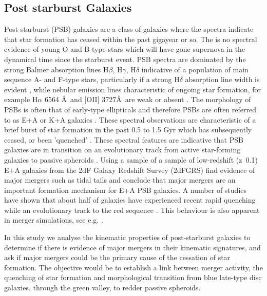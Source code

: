 \subsection{Post starburst Galaxies}

Post-starburst (PSB) galaxies are a class of galaxies where the spectra indicate that star formation has ceased within the past gigayear or so. The is no spectral evidence of young O and B-type stars which will have gone supernova in the dynamical time since the starburst event. PSB spectra are dominated by the strong Balmer absorption lines H$\beta$, H$\gamma$, H$\delta$ indicative of a population of main sequence A- and F-type stars, particularly if a strong  H$\delta$ absorption line width is evident \citep{1997A&A...325.1025P}, while nebular emission lines characteristic of ongoing star formation, for example H$\alpha$ 6564 \AA\ and [OII] 3727\AA\, are weak or absent \citep{2001ApJ...547L..17B,2003PASJ...55..771G,2004MNRAS.355..713B,2005MNRAS.357..937G,2018MNRAS.477.1708P}. The morphology of PSBs is often that of early-type ellipticals and therefore PSBs are often referred to as E+A or K+A galaxies \citep{1983ApJ...270....7D,1996ApJ...466..104Z,2009ARA&A..47..159B}. These spectral observations are characteristic of a brief burst of star formation in the past 0.5 to 1.5 Gyr which has subsequently ceased, or been 'quenched' \citep{1983ApJ...270....7D,1987MNRAS.229..423C,1997A&A...325.1025P}. These spectral features are indicative that PSB galaxies are in transition on an evolutionary track from active star-forming galaxies to passive spheroids \citep{2004MNRAS.355..713B,2012MNRAS.420..672S,2013MNRAS.429.2212M}. Using a sample of a sample of low-redshift (z~0.1) E+A galaxies from the 2dF Galaxy Redshift Survey (2dFGRS) \citet{2004MNRAS.355..713B} find evidence of major mergers such as tidal tails and conclude that major mergers are an important formation mechanism for E+A PSB galaxies. A number of studies have shown that about half of galaxies have experienced recent rapid quenching while an evolutionary track to the red sequence \citep{Martin_2007,10.1111/j.1365-2966.2009.14537.x,2015MNRAS.450..435S}. This behaviour is also apparent in merger simulations, see e.g. \cite{2019MNRAS.484.2447D}.

In this study we analyse the kinematic properties of post-starburst galaxies to determine if there is evidence of major mergers in their kinematic signatures, and ask if major mergers could be the primary cause of the cessation of star formation. The objective would be to establish a link between merger activity, the quenching of star formation and morphological transition from blue late-type disc galaxies, through the green valley, to redder passive spheroids.

